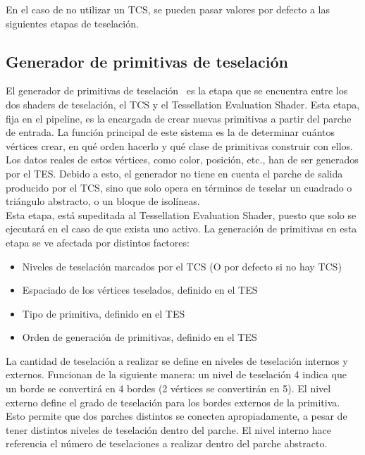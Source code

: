 En el caso de no utilizar un TCS, se pueden pasar valores por defecto a las
siguientes etapas de teselación.

\subsection{Generador de primitivas de teselación}
\label{ref:TesPriGen}

El generador de primitivas de teselación~\cite{TesPriGen} es la etapa que se
encuentra entre los dos shaders de teselación, el TCS y el Tessellation
Evaluation Shader. Esta etapa, fija en el pipeline, es la encargada de crear
nuevas primitivas a partir del parche de entrada. La función principal de este
sistema es la de determinar cuántos vértices crear, en qué orden hacerlo y qué
clase de primitivas construir con ellos. Los datos reales de estos vértices,
como color, posición, etc., han de ser generados por el TES. Debido a esto, el
generador no tiene en cuenta el parche de salida producido por el TCS, sino que
solo opera en términos de teselar un cuadrado o triángulo abstracto, o un bloque
de isolíneas.\\

Esta etapa, está supeditada al Tessellation Evaluation Shader, puesto que solo
se ejecutará en el caso de que exista uno activo. La generación de primitivas en
esta etapa se ve afectada por distintos factores:

\begin{itemize}
		\item Niveles de teselación marcados por el TCS (O por defecto si no hay
				TCS)
		\item Espaciado de los vértices teselados, definido en el TES
		\item Tipo de primitiva, definido en el TES
		\item Orden de generación de primitivas, definido en el TES
\end{itemize}

La cantidad de teselación a realizar se define en niveles de teselación internos
y externos. Funcionan de la siguiente manera: un nivel de teselación 4 indica
que un borde se convertirá en 4 bordes (2 vértices se convertirán en 5). El
nivel externo define el grado de teselación para los bordes externos de la
primitiva. Esto permite que dos parches distintos se conecten apropiadamente, a
pesar de tener distintos niveles de teselación dentro del parche. El nivel
interno hace referencia el número de teselaciones a realizar dentro del parche
abstracto. \\

